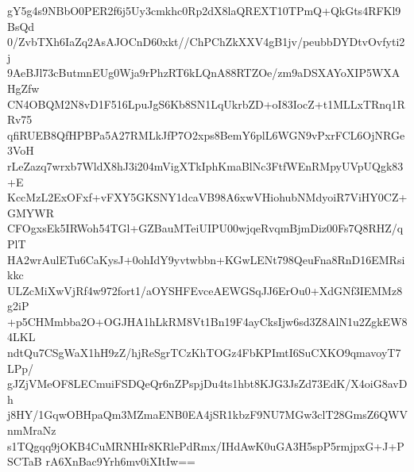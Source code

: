 gY5g4s9NBbO0PER2f6j5Uy3cmkhc0Rp2dX8laQREXT10TPmQ+QkGts4RFKl9BsQd
0/ZvbTXh6IaZq2AsAJOCnD60xkt//ChPChZkXXV4gB1jv/peubbDYDtvOvfyti2j
9AeBJl73cButmnEUg0Wja9rPhzRT6kLQnA88RTZOe/zm9aDSXAYoXIP5WXAHgZfw
CN4OBQM2N8vD1F516LpuJgS6Kb8SN1LqUkrbZD+oI83IocZ+t1MLLxTRnq1RRv75
qfiRUEB8QfHPBPa5A27RMLkJfP7O2xps8BemY6plL6WGN9vPxrFCL6OjNRGe3VoH
rLeZazq7wrxb7WldX8hJ3i204mVigXTkIphKmaBlNc3FtfWEnRMpyUVpUQgk83+E
KccMzL2ExOFxf+vFXY5GKSNY1dcaVB98A6xwVHiohubNMdyoiR7ViHY0CZ+GMYWR
CFOgxsEk5IRWoh54TGl+GZBauMTeiUIPU00wjqeRvqmBjmDiz00Fs7Q8RHZ/qPlT
HA2wrAulETu6CaKysJ+0ohIdY9yvtwbbn+KGwLENt798QeuFna8RnD16EMRsikkc
ULZcMiXwVjRf4w972fort1/aOYSHFEvceAEWGSqJJ6ErOu0+XdGNf3IEMMz8g2iP
+p5CHMmbba2O+OGJHA1hLkRM8Vt1Bn19F4ayCksIjw6sd3Z8AlN1u2ZgkEW84LKL
ndtQu7CSgWaX1hH9zZ/hjReSgrTCzKhTOGz4FbKPImtI6SuCXKO9qmavoyT7LPp/
gJZjVMeOF8LECmuiFSDQeQr6nZPspjDu4ts1hbt8KJG3JsZd73EdK/X4oiG8avDh
j8HY/1GqwOBHpaQm3MZmaENB0EA4jSR1kbzF9NU7MGw3clT28GmsZ6QWVnmMraNz
s1TQgqq9jOKB4CuMRNHIr8KRlePdRmx/IHdAwK0uGA3H5spP5rmjpxG+J+PSCTaB
rA6XnBac9Yrh6mv0iXItIw==
